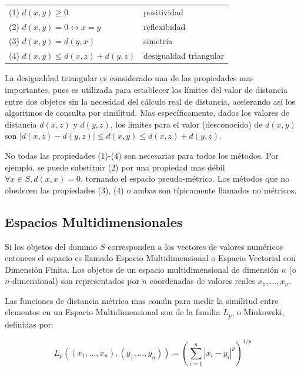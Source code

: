\begin{tabular}{ l l }
  (1) $d(x, y) \geq 0   $ & positividad\\
  (2) $d(x, y) = 0 \leftrightarrow x = y$ & reflexibidad\\
  (3) $d(x, y) = d(y, x)$ & simetria\\
  (4) $d(x, y) \leq d(x, z) + d(y, z)$ & desigualdad triangular\\
\end{tabular}
\vspace{0.5cm}

La desigualdad triangular es considerado una de las propiedades mas importantes, pues es utilizada para establecer los límites del valor de distancia entre dos objetos sin la necesidad del cálculo real de distancia, acelerando así los algoritmos de consulta por similitud. Mas específicamente, dados los valores de distancia $d(x,z)$ y $d(y, z)$, los limites para el valor (desconocido) de $d(x, y)$ son $|d(x,z) - d(y, z)| \leq d(x, y) \leq d(x,z) + d(y, z)$.

No todas las propiedades (1)-(4) son necesarias para todos los métodos. Por ejemplo, se puede substituir (2) por una propiedad mas débil $\forall x \in S, d(x,x) = 0$, tornando el espacio pseudo-métrico. Los métodos que no obedecen las propiedades (3), (4) o ambas son típicamente llamados no métricos.


\subsection{Espacios Multidimensionales}

Si los objetos del dominio $S$ corresponden a los vectores de valores numéricos entonces el espacio es llamado Espacio Multidimensional o Espacio Vectorial con Dimensión Finita. Los objetos de un espacio multidimensional de dimensión $n$ (o $n$-dimensional) son representados por $n$ coordenadas de valores reales ${x_1, ..., x_n}$.

Las funciones de distancia métrica mas común para medir la similitud entre elementos en un Espacio Multidimensional son de la familia $L_p$, o Minkowski, definidas por:

\begin{equation}
 L_p ((x_1,...,x_n), (y_1,...,y_n)) = (\sum_{i=1}^{n} |x_i - y_i|^p)^{1/p}
\end{equation}

